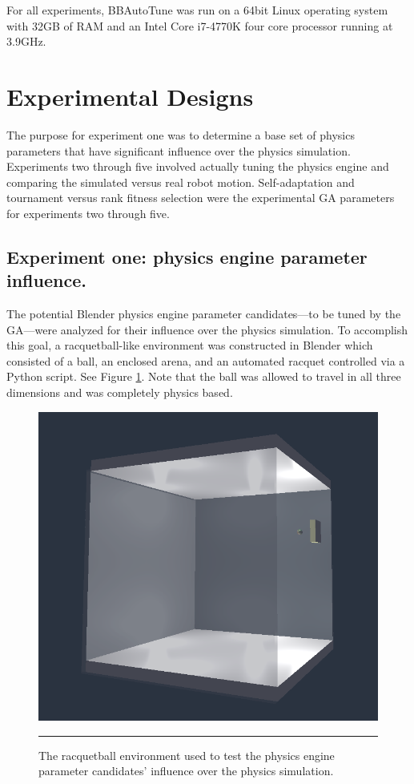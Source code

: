 For all experiments, BBAutoTune was run on a 64bit Linux operating system with 32GB of RAM and an Intel Core i7-4770K four core processor running at 3.9GHz.

\section{Experimental Designs}

The purpose for experiment one was to determine a base set of physics parameters that have significant influence over the physics simulation. Experiments two through five involved actually tuning the physics engine and comparing the simulated versus real robot motion. Self-adaptation and tournament versus rank fitness selection were the experimental GA parameters for experiments two through five. 

\subsection[Experiment One]{Experiment one: physics engine parameter influence.}

The potential Blender physics engine parameter candidates---to be tuned by the GA---were analyzed for their influence over the physics simulation. To accomplish this goal, a racquetball-like environment was constructed in Blender which consisted of a ball, an enclosed arena, and an automated racquet controlled via a Python script. See Figure \ref{fig:racquetball}. Note that the ball was allowed to travel in all three dimensions and was completely physics based.

\begin{figure}[htbp]
\centering
\includegraphics[scale=0.4]{../Figures/Chapter4/racquetball.png}
\rule{35em}{0.5pt}
\caption[Physics Engine Parameter Influence Racquetball Environment]{The racquetball environment used to test the physics engine parameter candidates' influence over the physics simulation.}
\label{fig:racquetball}
\end{figure}

